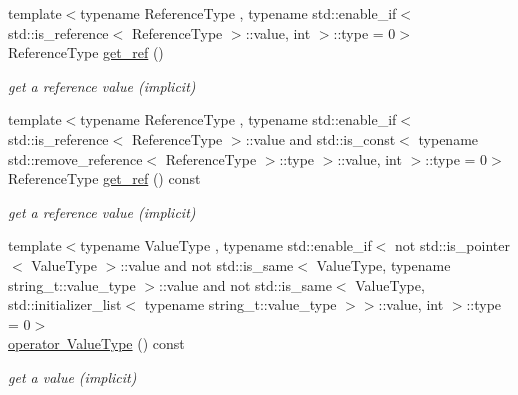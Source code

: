 \begin{DoxyCompactItemize}
{\footnotesize template$<$typename Reference\+Type , typename std\+::enable\+\_\+if$<$ std\+::is\+\_\+reference$<$ Reference\+Type $>$\+::value, int $>$\+::type  = 0$>$ }\\Reference\+Type \mbox{\hyperlink{classnlohmann_1_1basic__json_afbd800010b67619463c0fce6e74f7878}{get\+\_\+ref}} ()
\begin{DoxyCompactList}\small\item\em get a reference value (implicit) \end{DoxyCompactList}\item 
{\footnotesize template$<$typename Reference\+Type , typename std\+::enable\+\_\+if$<$ std\+::is\+\_\+reference$<$ Reference\+Type $>$\+::value and std\+::is\+\_\+const$<$ typename std\+::remove\+\_\+reference$<$ Reference\+Type $>$\+::type $>$\+::value, int $>$\+::type  = 0$>$ }\\Reference\+Type \mbox{\hyperlink{classnlohmann_1_1basic__json_ac382f3d2bc6a5d52d936e4e40593f03b}{get\+\_\+ref}} () const
\begin{DoxyCompactList}\small\item\em get a reference value (implicit) \end{DoxyCompactList}\item 
{\footnotesize template$<$typename Value\+Type , typename std\+::enable\+\_\+if$<$ not std\+::is\+\_\+pointer$<$ Value\+Type $>$\+::value and not std\+::is\+\_\+same$<$ Value\+Type, typename string\+\_\+t\+::value\+\_\+type $>$\+::value and not std\+::is\+\_\+same$<$ Value\+Type, std\+::initializer\+\_\+list$<$ typename string\+\_\+t\+::value\+\_\+type $>$$>$\+::value, int $>$\+::type  = 0$>$ }\\\mbox{\hyperlink{classnlohmann_1_1basic__json_a1f1d4bc973c5b866db3d96e14d2c9f3f}{operator Value\+Type}} () const
\begin{DoxyCompactList}\small\item\em get a value (implicit) \end{DoxyCompactList}\end{DoxyCompactItemize}
